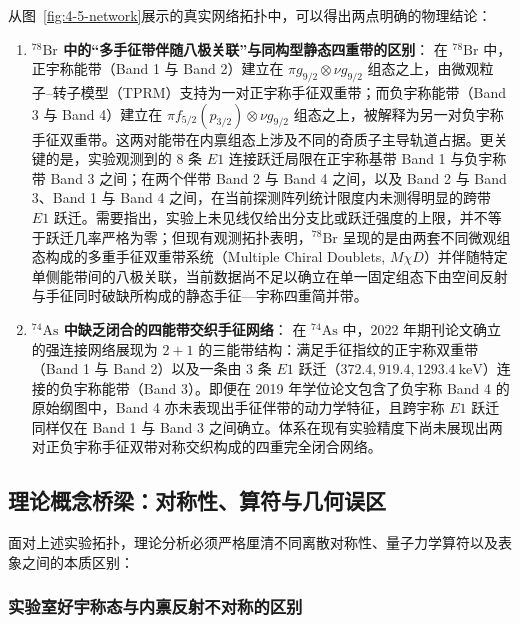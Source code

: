 从图~\ref{fig:4-5-network}展示的真实网络拓扑中，可以得出两点明确的物理结论：
\begin{enumerate}
\item \textbf{$^{78}\mathrm{Br}$ 中的“多手征带伴随八极关联”与同构型静态四重带的区别}：
在 $^{78}\mathrm{Br}$ 中，正宇称能带（Band 1 与 Band 2）建立在 $\pi g_{9/2} \otimes \nu g_{9/2}$ 组态之上，由微观粒子--转子模型（TPRM）支持为一对正宇称手征双重带；而负宇称能带（Band 3 与 Band 4）建立在 $\pi f_{5/2}(p_{3/2}) \otimes \nu g_{9/2}$ 组态之上，被解释为另一对负宇称手征双重带。这两对能带在内禀组态上涉及不同的奇质子主导轨道占据。更关键的是，实验观测到的 8 条 $E1$ 连接跃迁局限在正宇称基带 Band 1 与负宇称带 Band 3 之间；在两个伴带 Band 2 与 Band 4 之间，以及 Band 2 与 Band 3、Band 1 与 Band 4 之间，在当前探测阵列统计限度内未测得明显的跨带 $E1$ 跃迁。需要指出，实验上未见线仅给出分支比或跃迁强度的上限，并不等于跃迁几率严格为零；但现有观测拓扑表明，$^{78}\mathrm{Br}$ 呈现的是由两套不同微观组态构成的多重手征双重带系统（Multiple Chiral Doublets, $M\chi D$）并伴随特定单侧能带间的八极关联，当前数据尚不足以确立在单一固定组态下由空间反射与手征同时破缺所构成的静态手征---宇称四重简并带。
\item \textbf{$^{74}\mathrm{As}$ 中缺乏闭合的四能带交织手征网络}：
在 $^{74}\mathrm{As}$ 中，2022 年期刊论文确立的强连接网络展现为 $2+1$ 的三能带结构：满足手征指纹的正宇称双重带（Band 1 与 Band 2）以及一条由 3 条 $E1$ 跃迁（$372.4, 919.4, 1293.4\ \mathrm{keV}$）连接的负宇称能带（Band 3）。即便在 2019 年学位论文包含了负宇称 Band 4 的原始纲图中，Band 4 亦未表现出手征伴带的动力学特征，且跨宇称 $E1$ 跃迁同样仅在 Band 1 与 Band 3 之间确立。体系在现有实验精度下尚未展现出两对正负宇称手征双带对称交织构成的四重完全闭合网络。
\end{enumerate}

\subsection{理论概念桥梁：对称性、算符与几何误区}\label{sec:4-5-3}

面对上述实验拓扑，理论分析必须严格厘清不同离散对称性、量子力学算符以及表象之间的本质区别：

\subsubsection{实验室好宇称态与内禀反射不对称的区别}

